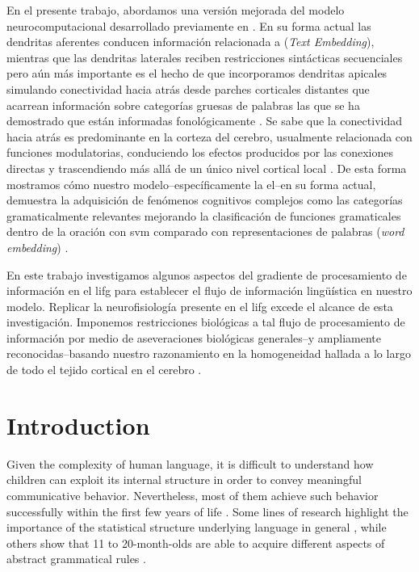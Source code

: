 {En el presente trabajo, abordamos una versión mejorada del modelo neurocomputacional desarrollado previamente en \cite{10.1371/journal.pone.0217966}.
En su forma actual las dendritas aferentes conducen información relacionada a  (\emph{Text Embedding}), mientras que las dendritas laterales reciben restricciones sintácticas secuenciales pero aún más importante es el hecho de que incorporamos dendritas apicales simulando conectividad hacia atrás desde parches corticales distantes que acarrean información sobre categorías gruesas de palabras las que se ha demostrado que están informadas fonológicamente \cite{doi:10.1207/s15327078in1002_5, lohmann_phonological_2017}.
Se sabe que la conectividad hacia atrás es predominante en la corteza del cerebro, usualmente relacionada con funciones modulatorias, conduciendo los efectos producidos por las conexiones directas y trascendiendo más allá de un único nivel cortical local \cite{news_hidden_2018, marques_functional_2018, Chen2009ForwardAB}.
De esta forma mostramos cómo nuestro modelo--específicamente la \gls{el}--en su forma actual, demuestra la adquisición de fenómenos cognitivos complejos como las categorías gramaticalmente relevantes mejorando la clasificación de funciones gramaticales dentro de la oración con \gls{svm} comparado con representaciones de palabras (\emph{word embedding}) \cite{Mikolov:2013:DRW:2999792.2999959, mikolov2013linguistic, journals/corr/abs-1301-3781}.

En este trabajo investigamos algunos aspectos del gradiente de procesamiento de información en el \gls{lifg} para establecer el flujo de información lingüística en nuestro modelo.
Replicar la neurofisiología presente en el \gls{lifg} excede el alcance de esta investigación.
Imponemos restricciones biológicas a tal flujo de procesamiento de información por medio de aseveraciones biológicas generales--y ampliamente reconocidas--basando nuestro razonamiento en la homogeneidad hallada a lo largo de todo el tejido cortical en el cerebro \cite{Carlo1488}.
}{
\section{Introduction}

Given the complexity of human language, it is difficult to understand how children can exploit its internal structure in order to convey meaningful communicative behavior. Nevertheless, most of them achieve such behavior successfully within the first few years of life \cite{Saffran12874}. Some lines of research highlight the importance of the statistical structure underlying language in general \cite{Romberg2010StatisticalLA, 10.1371/journal.pone.0177794}, while others show that 11 to 20-month-olds are able to acquire different aspects of abstract grammatical rules \cite{doi:10.1111/infa.12094, doi:10.1111/j.1467-8624.2012.01869.x}. 

}
